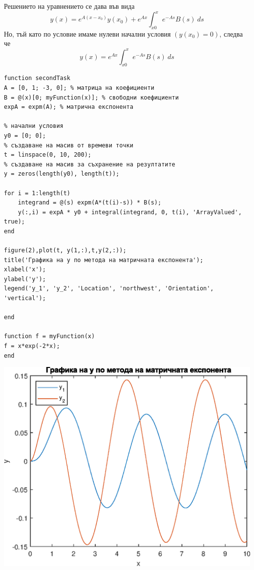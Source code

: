\documentclass[a4paper,fleqn,12pt]{article}
\begin{document}
Решението на уравнението се дава във вида
\begin{equation*}
	y(x)=e^{A(x-x_0)} y(x_0) + e^{Ax} \int_{x0} ^{x} e^{-As} B(s) \ ds
\end{equation*}
Но, тъй като по условие имаме нулеви начални условия $(y(x_0)=0)$, следва че 
\begin{equation*}
	y(x)=e^{Ax} \int_{x0} ^{x} e^{-As} B(s) \ ds
\end{equation*}
\newpage
\begin{verbatim}
function secondTask
A = [0, 1; -3, 0]; % матрица на коефициенти
B = @(x)[0; myFunction(x)]; % свободни коефициенти
expA = expm(A); % матрична експонента

% начални условия
y0 = [0; 0];
% създаване на масив от времеви точки
t = linspace(0, 10, 200);
% създаване на масив за съхранение на резултатите
y = zeros(length(y0), length(t));

for i = 1:length(t)
    integrand = @(s) expm(A*(t(i)-s)) * B(s);
    y(:,i) = expA * y0 + integral(integrand, 0, t(i), 'ArrayValued', true);
end

figure(2),plot(t, y(1,:),t,y(2,:));
title('Графика на y по метода на матричната експонента');
xlabel('x');
ylabel('y');
legend('y_1', 'y_2', 'Location', 'northwest', 'Orientation', 'vertical');

end

function f = myFunction(x)
f = x*exp(-2*x);
end
\end{verbatim}

\includegraphics{secondTask_01.eps}
\end{document}
